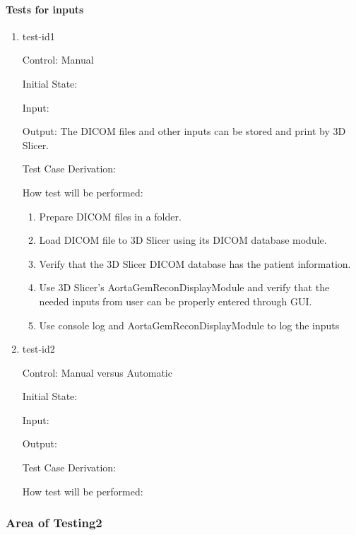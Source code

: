 \documentclass[12pt, titlepage]{article}
\begin{document}
\paragraph{Tests for inputs}

\begin{enumerate}

\item{test-id1\\}

Control: Manual
					
Initial State: 
					
Input: 
					
Output: The DICOM files and other inputs can be stored and print by 3D Slicer.

Test Case Derivation: 
					
How test will be performed: \\
\begin{enumerate}
\item{Prepare DICOM files in a folder.}
\item{Load DICOM file to 3D Slicer using its DICOM database module.}
\item{Verify that the 3D Slicer DICOM database has the patient information.}
\item{Use 3D Slicer's AortaGemReconDisplayModule and verify that the needed inputs from user can be properly entered through GUI.}
\item{Use console log and AortaGemReconDisplayModule to log the inputs}
\end{enumerate}
					
\item{test-id2\\}

Control: Manual versus Automatic
					
Initial State: 
					
Input: 
					
Output: 

Test Case Derivation: 

How test will be performed: 

\end{enumerate}

\subsubsection{Area of Testing2}
\end{document}
